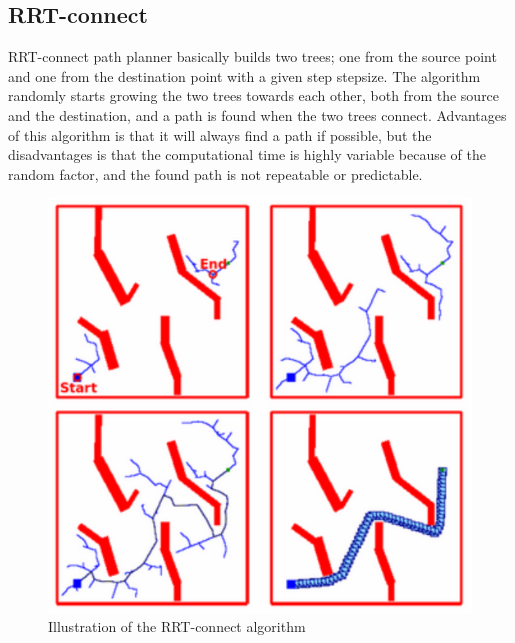 \documentclass[11pt]{article}
\begin{document}
\begin{lstlisting}

\end{lstlisting}

\newpage
\subsection{RRT-connect}
RRT-connect path planner basically builds two trees; one from the source point and one from the destination point with a given step stepsize.  The algorithm randomly starts growing the two trees towards each other, both from the source and the destination, and a path is found when the two trees connect. Advantages of this algorithm is that it will always find a path if possible, but the disadvantages is that the computational time is highly variable because of the random factor, and the found path is not repeatable or predictable.

\begin{figure}[H]
\centering
\includegraphics[scale=0.5]{img/Selection_050.png}
\caption{Illustration of the RRT-connect algorithm}
\label{fig::rrt}
\end{figure}
\end{document}
